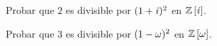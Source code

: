 \begin{ejerEuclidianos}
	Probar que $2$ es divisible por $(1+\mathit i)^2$ en ${\mathbb{Z}}\left[\mathit i\right]$.
\end{ejerEuclidianos}

\begin{ejerEuclidianos}
	Probar que $3$ es divisible por $(1-\omega)^2$ en
	${\mathbb{Z}}\left[\omega\right]$.
\end{ejerEuclidianos}

